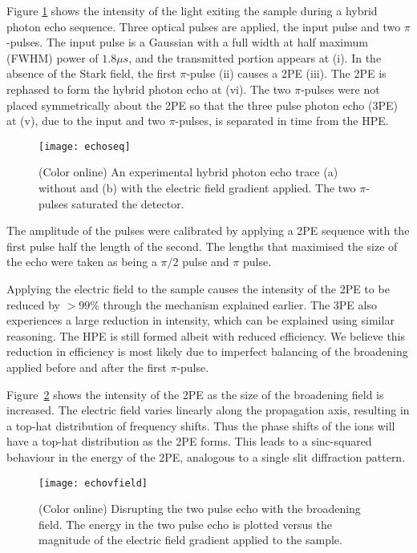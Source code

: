 \documentclass[superscriptaddress,pra,twocolumn,showpacs,amsmath,amssymb,aps,a4paper]{revtex4}
\begin{document}
Figure \ref{fig:echoseq} shows the intensity of the light exiting the
sample during a hybrid photon echo sequence. Three optical pulses are
applied, the input pulse and two $\pi$-pulses. The input pulse is a
Gaussian with a full width at half maximum (FWHM) power of $1.8 \mu
s$, and the transmitted portion appears at (i). In the absence of the
Stark field, the first $\pi$-pulse (ii) causes a 2PE (iii). The 2PE is
rephased to form the hybrid photon echo at (vi). The two $\pi$-pulses
were not placed symmetrically about the 2PE so that the three pulse photon echo (3PE) at (v), due
to the input and two $\pi$-pulses, is separated in time from the HPE.

\begin{figure}
  \centering
  \texttt{[image: echoseq]}
  \caption{(Color online) An experimental hybrid photon echo trace (a) without and (b)
    with the electric field gradient applied. The two
    $\pi$-pulses saturated the detector.}
  \label{fig:echoseq}
\end{figure}

The amplitude of the pulses were calibrated by applying a
2PE sequence with the first pulse half the length of the
second. The lengths that maximised the size of the echo were taken as
being a $\pi/2$ pulse and $\pi$ pulse.

Applying the electric field to the sample causes the intensity of the
2PE to be reduced by $> 99\%$ through the mechanism explained
earlier. The 3PE also experiences a large reduction in intensity,
which can be explained using similar reasoning.  The HPE is still
formed albeit with reduced efficiency. We believe this reduction in
efficiency is most likely due to imperfect balancing of the broadening
applied before and after the first $\pi$-pulse.

Figure~\ref{fig:echovfield} shows the intensity of the 2PE
as the size of the broadening field is increased. The
electric field varies linearly along the propagation axis, 
resulting in a top-hat distribution of frequency shifts.  Thus the
phase shifts of the ions will have a top-hat distribution as the 2PE forms.
This leads to a sinc-squared behaviour in the energy of the 2PE, analogous to a single slit diffraction pattern.


\begin{figure}%
  \centering
  \texttt{[image: echovfield]}
  \caption{(Color online) \label{fig:echovfield} Disrupting the two
    pulse echo with
    the broadening field. The energy in the two pulse echo is plotted
    versus the magnitude of the electric field gradient applied to the
    sample.}
\end{figure}
\end{document}
